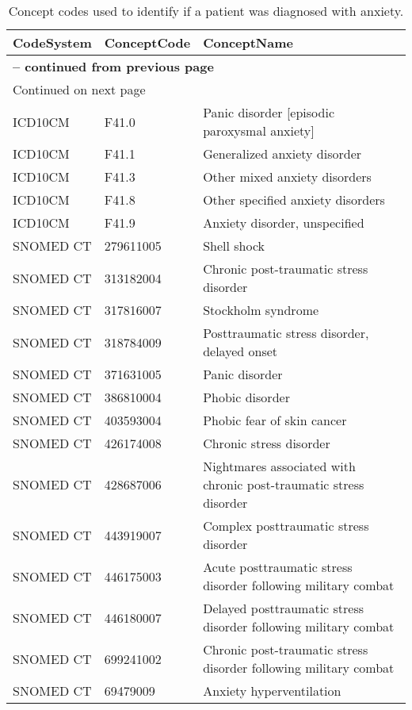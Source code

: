\begin{longtable}{p{}p{}p{}}
\caption{Concept codes used to identify if a patient was diagnosed with anxiety.} \\ 
 CodeSystem & ConceptCode & ConceptName \\ 
  \hline 
\endfirsthead 
\multicolumn{3}{p{\textwidth}}{{ \bfseries \tablename \thetable{} -- continued from previous page}} \ 
\hline CodeSystem & ConceptCode & ConceptName \\ \hline 
\endhead 
\hline \multicolumn{3}{p{\textwidth}}{{Continued on next page}} \\ \hline 
\endfoot 
\hline 
\endlastfoot 
 \hline
ICD10CM & F41.0 & Panic disorder [episodic paroxysmal anxiety] \\ 
  ICD10CM & F41.1 & Generalized anxiety disorder \\ 
  ICD10CM & F41.3 & Other mixed anxiety disorders \\ 
  ICD10CM & F41.8 & Other specified anxiety disorders \\ 
  ICD10CM & F41.9 & Anxiety disorder, unspecified \\ 
  SNOMED CT & 279611005 & Shell shock \\ 
  SNOMED CT & 313182004 & Chronic post-traumatic stress disorder \\ 
  SNOMED CT & 317816007 & Stockholm syndrome \\ 
  SNOMED CT & 318784009 & Posttraumatic stress disorder, delayed onset \\ 
  SNOMED CT & 371631005 & Panic disorder \\ 
  SNOMED CT & 386810004 & Phobic disorder \\ 
  SNOMED CT & 403593004 & Phobic fear of skin cancer \\ 
  SNOMED CT & 426174008 & Chronic stress disorder \\ 
  SNOMED CT & 428687006 & Nightmares associated with chronic post-traumatic stress disorder \\ 
  SNOMED CT & 443919007 & Complex posttraumatic stress disorder \\ 
  SNOMED CT & 446175003 & Acute posttraumatic stress disorder following military combat \\ 
  SNOMED CT & 446180007 & Delayed posttraumatic stress disorder following military combat \\ 
  SNOMED CT & 699241002 & Chronic post-traumatic stress disorder following military combat \\ 
  SNOMED CT & 69479009 & Anxiety hyperventilation \\ 

\end{longtable}
